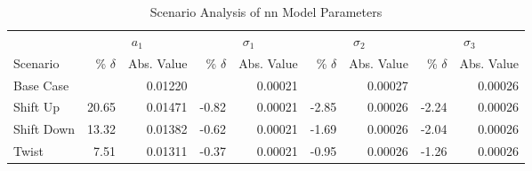 \begin{table}[H]
	\centering
	\setlength{\tabcolsep}{5pt}
	\caption{Scenario Analysis of \ac{nn} Model Parameters}
	\label{tab:scenario_analysis_part_nn}
	\begin{threeparttable}
		\begin{tabular}{l *{4}{rr}}
			\toprule
			           & \multicolumn{2}{c}{$a_1$} & \multicolumn{2}{c}{$\sigma_1$} & \multicolumn{2}{c}{$\sigma_2$} & \multicolumn{2}{c}{$\sigma_3$}                                                       \\
			\cmidrule(lr){2-3} \cmidrule(lr){4-5} \cmidrule(lr){6-7} \cmidrule(lr){8-9}
			Scenario   & \% $\delta$               & Abs. Value                     & \% $\delta$                    & Abs. Value                     & \% $\delta$ & Abs. Value & \% $\delta$ & Abs. Value \\
			\midrule

			Base Case  &                           & 0.01220                        &                                & 0.00021                        &             & 0.00027    &             & 0.00026    \\
			Shift Up   & 20.65                     & 0.01471                        & -0.82                          & 0.00021                        & -2.85       & 0.00026    & -2.24       & 0.00026    \\
			Shift Down & 13.32                     & 0.01382                        & -0.62                          & 0.00021                        & -1.69       & 0.00026    & -2.04       & 0.00026    \\
			Twist      & 7.51                      & 0.01311                        & -0.37                          & 0.00021                        & -0.95       & 0.00026    & -1.26       & 0.00026    \\
			\bottomrule
		\end{tabular}
	\end{threeparttable}
\end{table}

